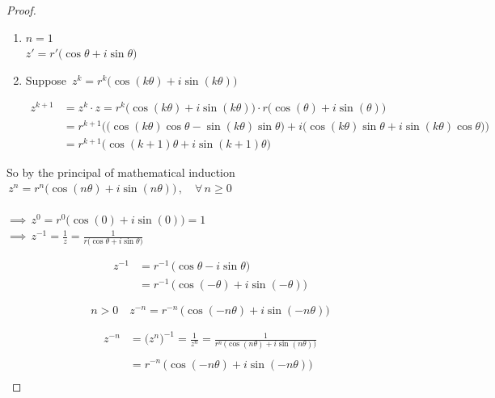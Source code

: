 \documentclass[11pt,a4paper]{article}
\theoremstyle{definition}
\begin{document}
\begin{proof}
\begin{enumerate}
\item[\textbf{Step 1:}] $n = 1$\\

$z' = r'\big( \cos \theta + i \sin \theta\big)$\\


\item[\textbf{Step 2:}] Suppose $\, z^k = r^k \big( \cos (k\theta) + i \sin (k\theta)\big)$

\begin{align*}
z^{k + 1} & = z^k\cdot z = r^k \big( \cos (k\theta) + i \sin (k\theta)\big)\cdot r \big( \cos (\theta) + i \sin (\theta)\big)\\
& = r^{k + 1}\big( \big(\cos (k\theta)\cos \theta - \sin (k\theta)\sin \theta\big) + i \big( \cos (k\theta)\sin \theta + i\sin (k\theta) \cos \theta)\big)\\
& = r^{k + 1} \big( \cos (k+1)\theta + i \sin (k + 1)\theta\big)
\end{align*}
\end{enumerate}

So by the principal of mathematical induction $\, z^n = r^n \big(\cos (n\theta) + i\sin (n\theta)\big)\,,\quad  \forall\, n \geq 0$\\\\



$\implies\, z^0 = r^0 \big(\cos (0) + i \sin (0)\big) = 1$\\

$\implies\, z^{-1} = \frac{1}{z} = \frac{1}{r\big(\cos \theta + i\sin \theta\big)}$

\begin{align*}
z^{-1} &  = r^{-1} \, \big( \cos \theta - i \sin \theta\big)\\
& = r^{-1}\, \big(\cos (-\theta) + i \sin (-\theta)\big)
\end{align*}

$$n> 0 \quad  z^{-n} = r^{-n}\, \big( \cos (-n\theta) + i\sin (-n\theta)\big)$$
 
 
\begin{align*}
z^{-n} & = \big(z^n\big)^{-1} = \frac{1}{z^n} = \frac{1}{r^n\,\big(\cos(n\theta) + i \sin (n\theta)\big)}\\\\
& = r^{-n}\,\big(\cos (-n\theta) + i\sin (-n\theta)\big)\\
\end{align*} 


\end{proof}
\end{document}
